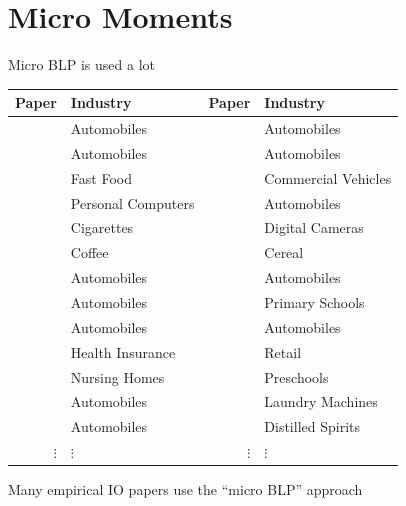 \section{Micro Moments}

\begin{frame}{Micro BLP is used a lot}
    \vspace{0.5em}
    \scriptsize
    \begin{tabular}{rlrl}
        Paper & Industry & Paper & Industry \\
        \midrule
        \cite*{petrin2002quantifying} & Automobiles & \cite*{barwick2017local} & Automobiles \\
        \cite*{berry2004differentiated} & Automobiles & \cite*{murry2017advertising} & Automobiles \\
        \cite*{thomadsen2005effect} & Fast Food & \cite*{wollmann2018trucks} & Commercial Vehicles \\
        \cite*{goeree2008limited} & Personal Computers & \cite*{li2018better} & Automobiles \\
        \cite*{ciliberto2010public} & Cigarettes & \cite*{li2018empirical} & Digital Cameras \\
        \cite*{nakamura2010accounting} & Coffee & \cite*{backus2021common} & Cereal \\
        \cite*{beresteanu2011gasoline} & Automobiles & \cite*{grieco2021evolution} & Automobiles \\
        \cite*{li2012traffic} & Automobiles & \cite*{neilson2021targeted} & Primary Schools \\
        \cite*{copeland2014intertemporal} & Automobiles & \cite*{armitage2022regulatory} & Automobiles \\
        \cite*{starc2014insurer} & Health Insurance & \cite*{dopper2022rising} & Retail \\
        \cite*{ching2015quantifying} & Nursing Homes & \cite*{bodere2023dynamic} & Preschools \\
        \cite*{li2015price} & Automobiles & \cite*{montag2023mergers} & Laundry Machines \\
        \cite*{nurski2016exclusive} & Automobiles & \cite*{conlon2023market} & Distilled Spirits \\
        $\vdots$ & $\vdots$ & $\vdots$ & $\vdots$
    \end{tabular}
    \normalsize
    \vspace{0.5em}
    \begin{wideitemize}
        \item Many empirical IO papers use the ``micro BLP'' approach

\end{wideitemize}
\end{frame}
